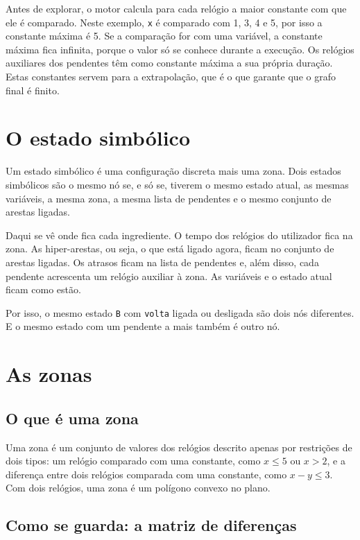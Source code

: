 \documentclass[11pt,a4paper]{article}
\newcommand{\code}[1]{\texttt{#1}}
\begin{document}
Antes de explorar, o motor calcula para cada relógio a maior constante com que ele é comparado. Neste exemplo, \code{x} é comparado com 1, 3, 4 e 5, por isso a constante máxima é 5. Se a comparação for com uma variável, a constante máxima fica infinita, porque o valor só se conhece durante a execução. Os relógios auxiliares dos pendentes têm como constante máxima a sua própria duração. Estas constantes servem para a extrapolação, que é o que garante que o grafo final é finito.

\section{O estado simbólico}

Um estado simbólico é uma configuração discreta mais uma zona. Dois estados simbólicos são o mesmo nó se, e só se, tiverem o mesmo estado atual, as mesmas variáveis, a mesma zona, a mesma lista de pendentes e o mesmo conjunto de arestas ligadas.

Daqui se vê onde fica cada ingrediente. O tempo dos relógios do utilizador fica na zona. As hiper-arestas, ou seja, o que está ligado agora, ficam no conjunto de arestas ligadas. Os atrasos ficam na lista de pendentes e, além disso, cada pendente acrescenta um relógio auxiliar à zona. As variáveis e o estado atual ficam como estão.

Por isso, o mesmo estado \code{B} com \code{volta} ligada ou desligada são dois nós diferentes. E o mesmo estado com um pendente a mais também é outro nó.

\section{As zonas}

\subsection{O que é uma zona}

Uma zona é um conjunto de valores dos relógios descrito apenas por restrições de dois tipos: um relógio comparado com uma constante, como \(x \leq 5\) ou \(x > 2\), e a diferença entre dois relógios comparada com uma constante, como \(x - y \leq 3\). Com dois relógios, uma zona é um polígono convexo no plano.

\subsection{Como se guarda: a matriz de diferenças}
\end{document}
